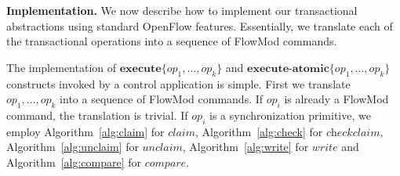 \documentclass[conference]{sigcomm-alternate}
\newcommand{\liron}[1]{\textit{\textcolor{mygreen}{[liron]: #1}}} %
\newcommand{\exec}{\textbf{execute}}
\newcommand{\execatomic}{\textbf{execute-atomic}}
\begin{document}

\vspace{1mm}
\noindent\textbf{Implementation.} %
%
We now describe how to implement our transactional
abstractions using standard OpenFlow features.
Essentially, we translate each of the transactional operations into a
sequence of FlowMod commands.

The implementation of $\exec\{op_1,\ldots,op_k\}$ and
$\execatomic\{op_1,\ldots,op_k\}$ constructs
invoked by a control application is simple.
First we translate  $op_1,\ldots,op_k$ into a sequence of FlowMod
commands. If $op_i$ is already a FlowMod command, the translation is
trivial. If $op_i$ is a synchronization primitive, we employ
Algorithm~\ref{alg:claim} for $\textit{claim}$,
Algorithm~\ref{alg:check} for $\textit{checkclaim}$,
Algorithm~\ref{alg:unclaim}
for $\textit{unclaim}$,
Algorithm~\ref{alg:write} for $\textit{write}$ and
Algorithm~\ref{alg:compare} for $\textit{compare}$.
\end{document}
